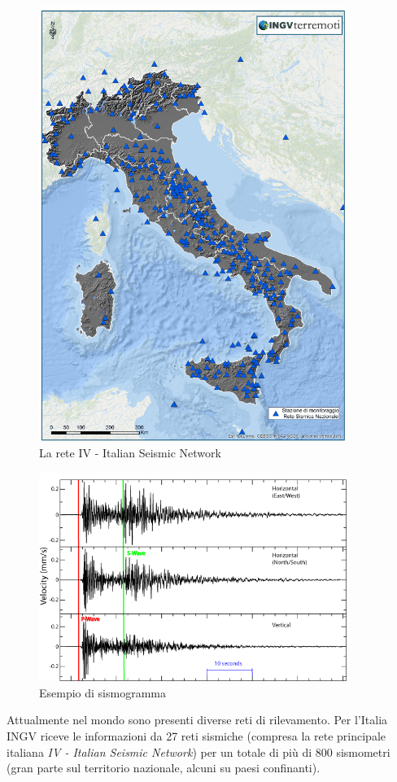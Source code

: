\documentclass[a4paper,10pt]{memoir}
\begin{document}
\begin{figure}[p]
\label{fig:retesensori}
\caption{La rete IV - Italian Seismic Network}
\centering
\includegraphics[width=10cm]{introduzione/rete_ingv}
\end{figure}

\begin{figure}[ht]
\label{fig:sismogramma}
\caption{Esempio di sismogramma}
\centering
\includegraphics[width=10cm]{introduzione/seismogram}
\end{figure}

Attualmente nel mondo sono presenti diverse reti di rilevamento. Per l'Italia INGV riceve le informazioni da 27 reti sismiche (compresa la rete principale italiana \textit{IV - Italian Seismic Network}) per un totale di più di 800 sismometri (gran parte sul territorio nazionale, alcuni su paesi confinanti).
\end{document}
